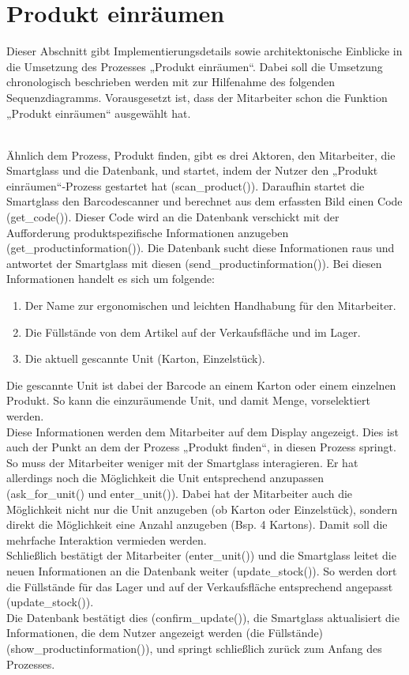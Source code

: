 \section{Produkt einräumen}
Dieser Abschnitt gibt Implementierungsdetails sowie architektonische Einblicke in die Umsetzung des Prozesses „Produkt einräumen“. Dabei soll die Umsetzung chronologisch beschrieben werden mit zur Hilfenahme des folgenden Sequenzdiagramms. Vorausgesetzt ist, dass der Mitarbeiter schon die Funktion „Produkt einräumen“ ausgewählt hat. 
\\
\begin{figure}

\end{figure}
\\
Ähnlich dem Prozess, Produkt finden, gibt es drei Aktoren, den Mitarbeiter, die Smartglass und die Datenbank, und startet, indem der Nutzer den „Produkt einräumen“-Prozess gestartet hat (scan_product()). Daraufhin startet die Smartglass den Barcodescanner und berechnet aus dem erfassten Bild einen Code (get_code()). Dieser Code wird an die Datenbank verschickt mit der Aufforderung produktspezifische Informationen anzugeben (get_productinformation()). Die Datenbank sucht diese Informationen raus und antwortet der Smartglass mit diesen (send_productinformation()). Bei diesen Informationen handelt es sich um folgende: 
\begin{enumerate}
	\item Der Name zur ergonomischen und leichten Handhabung für den Mitarbeiter.
	\item Die Füllstände von dem Artikel auf der Verkaufsfläche und im  Lager.
	\item Die aktuell gescannte Unit (Karton, Einzelstück).
\end{enumerate}
Die gescannte Unit ist dabei der Barcode an einem Karton oder einem einzelnen Produkt. So kann die einzuräumende Unit, und damit Menge, vorselektiert werden. 
\\
Diese Informationen werden dem Mitarbeiter auf dem Display angezeigt. Dies ist auch der Punkt an dem der Prozess „Produkt finden“, in diesen Prozess springt.
\\
So muss der Mitarbeiter weniger mit der Smartglass interagieren. Er hat allerdings noch die Möglichkeit die Unit entsprechend anzupassen (ask_for_unit() und enter_unit()). Dabei hat der Mitarbeiter auch die Möglichkeit nicht nur die Unit anzugeben (ob Karton oder Einzelstück), sondern direkt die Möglichkeit eine Anzahl anzugeben (Bsp. 4 Kartons). Damit soll die mehrfache Interaktion vermieden werden. 
\\
Schließlich bestätigt der Mitarbeiter (enter_unit()) und die Smartglass leitet die neuen Informationen an die Datenbank weiter (update_stock()). So werden dort die Füllstände für das Lager und auf der Verkaufsfläche entsprechend angepasst (update_stock()).
\\
Die Datenbank bestätigt dies (confirm_update()), die Smartglass aktualisiert die Informationen, die dem Nutzer angezeigt werden (die Füllstände) (show_productinformation()), und springt schließlich zurück zum Anfang des Prozesses. 
\\
